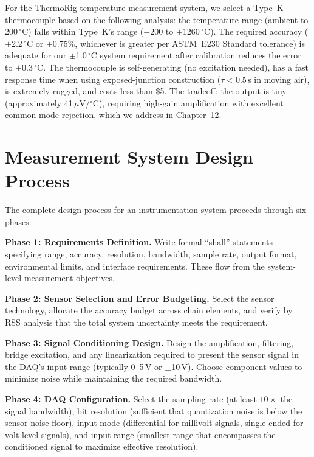 \documentclass[11pt,letterpaper,twoside,openany]{book}
\newcommand{\degC}{\ensuremath{{}^{\circ}\text{C}}}
\begin{document}
\begin{examplebox}
For the ThermoRig temperature measurement system, we select a Type~K thermocouple based on the following analysis: the temperature range (ambient to 200\,\degC{}) falls within Type~K's range ($-200$ to $+1260$\,\degC{}). The required accuracy ($\pm$2.2\,\degC{} or $\pm$0.75\%, whichever is greater per ASTM~E230 Standard tolerance) is adequate for our $\pm$1.0\,\degC{} system requirement after calibration reduces the error to $\pm$0.3\,\degC{}. The thermocouple is self-generating (no excitation needed), has a fast response time when using exposed-junction construction ($\tau < 0.5$\,s in moving air), is extremely rugged, and costs less than \$5. The tradeoff: the output is tiny (approximately 41\,$\mu$V/\degC{}), requiring high-gain amplification with excellent common-mode rejection, which we address in Chapter~12.
\end{examplebox}

\section{Measurement System Design Process}
The complete design process for an instrumentation system proceeds through six phases:

\textbf{Phase 1: Requirements Definition.} Write formal ``shall'' statements specifying range, accuracy, resolution, bandwidth, sample rate, output format, environmental limits, and interface requirements. These flow from the system-level measurement objectives.

\textbf{Phase 2: Sensor Selection and Error Budgeting.} Select the sensor technology, allocate the accuracy budget across chain elements, and verify by RSS analysis that the total system uncertainty meets the requirement.

\textbf{Phase 3: Signal Conditioning Design.} Design the amplification, filtering, bridge excitation, and any linearization required to present the sensor signal in the DAQ's input range (typically 0--5\,V or $\pm$10\,V). Choose component values to minimize noise while maintaining the required bandwidth.

\textbf{Phase 4: DAQ Configuration.} Select the sampling rate (at least $10\times$ the signal bandwidth), bit resolution (sufficient that quantization noise is below the sensor noise floor), input mode (differential for millivolt signals, single-ended for volt-level signals), and input range (smallest range that encompasses the conditioned signal to maximize effective resolution).
\end{document}
